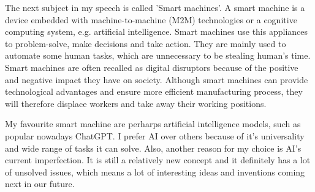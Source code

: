 \documentclass[a4paper,12pt]{article}
\begin{document}
    The next subject in my speech is called 'Smart machines'. A smart machine is a device embedded with machine-to-machine (M2M) technologies
    or a cognitive computing system, e.g. artificial intelligence. Smart machines use this appliances to problem-solve, make decisions and take action.
    They are mainly used to automate some human tasks, which are unnecessary to be stealing human's time.
    Smart machines are often recalled as digital disruptors because of the positive and negative impact they have on society. Although smart machines can
    provide technological advantages and ensure more efficient manufacturing process, they will therefore displace workers and take away their working positions.

    My favourite smart machine are perharps artificial intelligence models, such as popular nowadays ChatGPT. I prefer AI over others because of it's
    universality and wide range of tasks it can solve. Also, another reason for my choice is AI's current imperfection. It is still a relatively new concept
    and it definitely has a lot of unsolved issues, which means a lot of interesting ideas and inventions coming next in our future.

\end{document}

